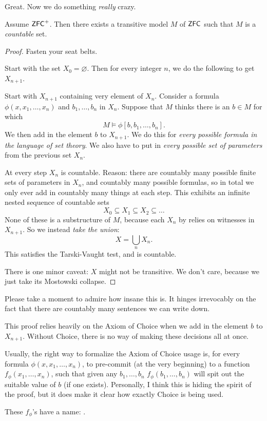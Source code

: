 Great. Now we do something \emph{really} crazy.
\begin{theorem}
	Assume $\mathsf{ZFC}^+$. Then there exists a transitive model $M$ of $\mathsf{ZFC}$
	such that $M$ is a \emph{countable} set.
\end{theorem}
\begin{proof}
	Fasten your seat belts.

	Start with the set $X_0 = \varnothing$.
	Then for every integer $n$, we do the following to get $X_{n+1}$.
	\begin{itemize}
		\ii Start with $X_{n+1}$ containing very element of $X_n$.
		\ii Consider a formula $\phi(x, x_1, \dots, x_n)$
		and $b_1, \dots, b_n$ in $X_n$.
		Suppose that $M$ thinks there is an $b \in M$ for which
		\[ M \vDash \phi[b, b_1, \dots, b_n]. \]
		We then add in the element $b$ to $X_{n+1}$.
		\ii We do this for \emph{every possible formula in the language of set theory}.
		We also have to put in \emph{every possible set of parameters} from the previous set $X_n$.
	\end{itemize}
	At every step $X_n$ is countable.
	Reason: there are countably many possible finite sets of parameters in $X_n$,
	and countably many possible formulas, so in total we only ever add in countably many things
	at each step.
	This exhibits an infinite nested sequence of countable sets
	\[ X_0 \subseteq X_1 \subseteq X_2 \subseteq \dots \]
	None of these is a substructure of $M$, because each $X_n$ by relies on witnesses in $X_{n+1}$.
	So we instead \emph{take the union}:
	\[ X = \bigcup_n X_n. \]
	This satisfies the Tarski-Vaught test, and is countable.

	There is one minor caveat: $X$ might not be transitive.
	We don't care, because we just take its Mostowski collapse.
\end{proof}

Please take a moment to admire how insane this is.
It hinges irrevocably on the fact that there are countably many sentences we can write down.

\begin{remark}
	This proof relies heavily on the Axiom of Choice
	when we add in the element $b$ to $X_{n+1}$.
	Without Choice, there is no way of making these decisions all at once.

	Usually, the right way to formalize the Axiom of Choice usage is,
	for every formula $\phi(x, x_1, \dots, x_n)$, to pre-commit (at the very beginning)
	to a function $f_\phi(x_1, \dots, x_n)$, such that given any $b_1, \dots, b_n$
	$f_\phi(b_1, \dots, b_n)$ will spit out the suitable value of $b$ (if one exists).
	Personally, I think this is hiding the spirit of the proof, but it does
	make it clear how exactly Choice is being used.

	These $f_\phi$'s have a name: .
\end{remark}


